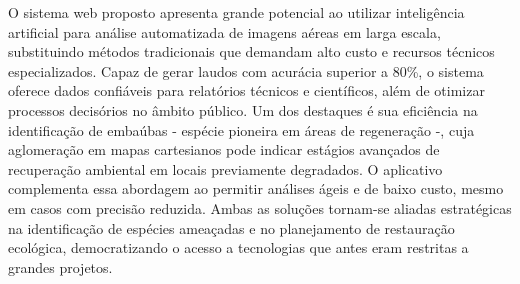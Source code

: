 O sistema web proposto apresenta grande potencial ao utilizar inteligência artificial para análise automatizada de imagens aéreas em larga escala, substituindo métodos tradicionais que demandam alto custo e recursos técnicos especializados. Capaz de gerar laudos com acurácia superior a 80\%, o sistema oferece dados confiáveis para relatórios técnicos e científicos, além de otimizar processos decisórios no âmbito público. Um dos destaques é sua eficiência na identificação de embaúbas - espécie pioneira em áreas de regeneração -, cuja aglomeração em mapas cartesianos pode indicar estágios avançados de recuperação ambiental em locais previamente degradados. O aplicativo complementa essa abordagem ao permitir análises ágeis e de baixo custo, mesmo em casos com precisão reduzida. Ambas as soluções tornam-se aliadas estratégicas na identificação de espécies ameaçadas e no planejamento de restauração ecológica, democratizando o acesso a tecnologias que antes eram restritas a grandes projetos.